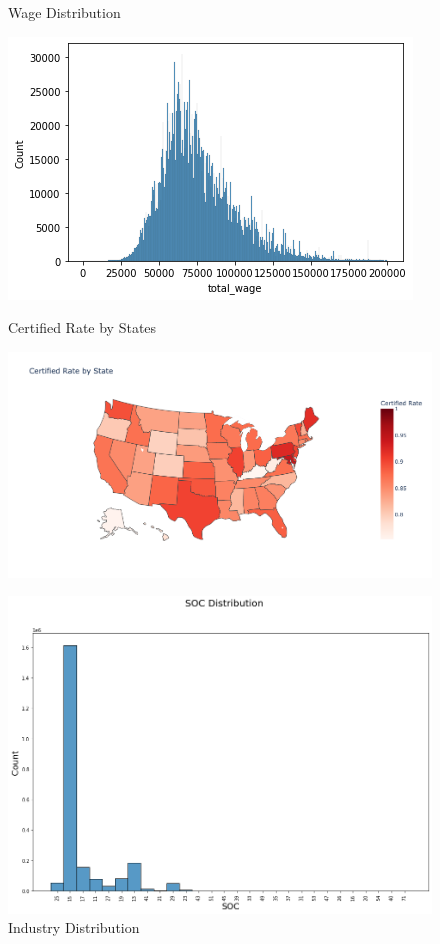 \documentclass{article}
\begin{document}
\begin{figure}[h]
\centering
    \begin{minipage}{.33\textwidth}
        \centering
        \caption{Wage Distribution}
        \includegraphics[width = \textwidth]{figures/wage_hist.png}
        \label{fig:wage_distribution}
    \end{minipage}
    \begin{minipage}{.34\textwidth}
        \centering
        \caption{Certified Rate by States}
        \includegraphics[width = \textwidth]{figures/fig3.png}
        \label{fig:state_distribution}
    \end{minipage}
    \begin{minipage}{.31\textwidth}
        \centering
        \caption{Industry Distribution}
        \includegraphics[width = \textwidth]{figures/fig8.png}

\end{minipage}
\end{figure}
\end{document}
